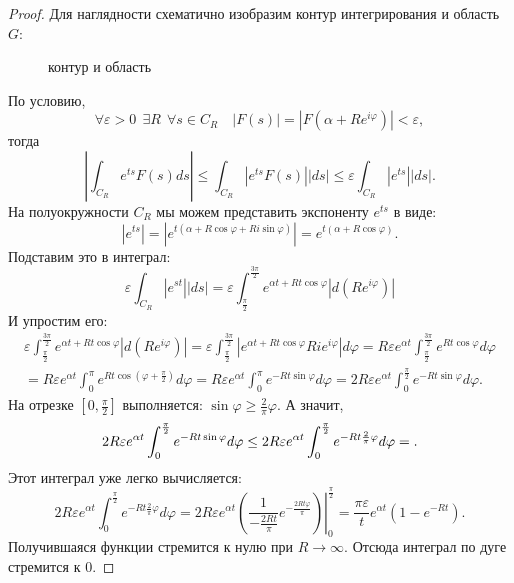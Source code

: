 \documentclass[../paper.tex]{subfile}
\begin{document}
\begin{proof}
Для наглядности схематично изобразим контур интегрирования и область $G$:

\begin{figure}[!ht]
	\centering
	
	\caption{контур и область}
\end{figure}

По условию, 
\[
	\forall \varepsilon > 0 \ \  \exists R \ \ \forall s \in C_R \quad \left| F(s) \right| = \left| F\left(\alpha + Re^{i\varphi}\right) \right|  < \varepsilon
,\] тогда
\[
	\left|\int_{C_R} e^{ts} F(s) ds\right|
	\le \int_{C_R} \left|e^{ts} F(s)\right| |ds|
	\le \varepsilon \int_{C_R} \left|e^{ts}\right| |ds|
.\]
На полуокружности $C_R$ мы можем представить экспоненту $e^{ts}$ в виде:
\[
	\left|e^{ts}\right|
	= \left|e^{t\left(\alpha+R\cos\varphi+Ri\sin\varphi\right)}\right|
	= e^{t\left(\alpha + R\cos\varphi\right)}
.\]
Подставим это в интеграл:
\[
	\varepsilon \int_{C_R} \left|e^{st}\right| |ds|
	= \varepsilon \int_{\frac{\pi}{2}}^{\frac{3\pi}{2}} e^{\alpha t + R t \cos \varphi} \left|d\left(Re^{i\varphi}\right)\right|
\]
И упростим его:
\begin{multline*}
	\varepsilon \int_{\frac{\pi}{2}}^{\frac{3\pi}{2}} e^{\alpha t + R t \cos \varphi} \left|d\left(Re^{i\varphi}\right)\right|
	= \varepsilon \int_{\frac{\pi}{2}}^{\frac{3\pi}{2}} \left|e^{\alpha t + R t \cos \varphi} R i e^{i\varphi} \right| d\varphi
	= R\varepsilon e^{\alpha t} \int_{\frac{\pi}{2}}^{\frac{3\pi}{2}} e^{R t \cos\varphi} d\varphi
	\\= R\varepsilon e^{\alpha t} \int_{0}^{\pi} e^{R t \cos \left(\varphi + \frac{\pi}{2}\right)} d\varphi
	= R\varepsilon e^{\alpha t} \int_{0}^{\pi} e^{-R t \sin\varphi} d\varphi
	= 2R\varepsilon e^{\alpha t} \int_{0}^{\frac{\pi}{2}} e^{-R t \sin\varphi} d\varphi
.\end{multline*}
На отрезке $[0, \frac{\pi}{2}]$ выполняется: $\sin\varphi \ge \frac{2}{\pi} \varphi$.
А значит,
\[
	2R\varepsilon e^{\alpha t} \int_{0}^{\frac{\pi}{2}} e^{-R t \sin\varphi} d\varphi
	\le 2R\varepsilon e^{\alpha t} \int_{0}^{\frac{\pi}{2}} e^{-R t \frac{2}{\pi}\varphi} d\varphi = \\
.\]
Этот интеграл уже легко вычисляется:
\[
	2R\varepsilon e^{\alpha t} \int_{0}^{\frac{\pi}{2}} e^{-R t \frac{2}{\pi}\varphi} d\varphi
	= 2R\varepsilon e^{\alpha t} \left.\left( \frac{1}{-\frac{2Rt}{\pi}}e^{- \frac{2 R t \varphi}{\pi}} \right) \right|_0^{\frac{\pi}{2}} 
        = \frac{\pi\varepsilon}{t} e^{\alpha t} \left(1 - e^{- R t} \right)
.\]
Получившаяся функции стремится к нулю при $R \to \infty$.
Отсюда интеграл по дуге стремится к $0$.
\end{proof}
\end{document}
